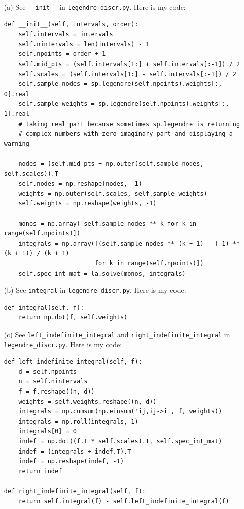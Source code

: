 \documentclass[10pt]{article}
\begin{document}
\begin{itemize}

\item[(a)] See \verb+__init__+ in \verb+legendre_discr.py+. Here is my code: \begin{lstlisting}
def __init__(self, intervals, order):
    self.intervals = intervals
    self.nintervals = len(intervals) - 1
    self.npoints = order + 1
    self.mid_pts = (self.intervals[1:] + self.intervals[:-1]) / 2
    self.scales = (self.intervals[1:] - self.intervals[:-1]) / 2
    self.sample_nodes = sp.legendre(self.npoints).weights[:, 0].real
    self.sample_weights = sp.legendre(self.npoints).weights[:, 1].real
    # taking real part because sometimes sp.legendre is returning
    # complex numbers with zero imaginary part and displaying a warning

    nodes = (self.mid_pts + np.outer(self.sample_nodes, self.scales)).T
    self.nodes = np.reshape(nodes, -1)
    weights = np.outer(self.scales, self.sample_weights)
    self.weights = np.reshape(weights, -1)

    monos = np.array([self.sample_nodes ** k for k in range(self.npoints)])
    integrals = np.array([(self.sample_nodes ** (k + 1) - (-1) ** (k + 1)) / (k + 1)
                         for k in range(self.npoints)])
    self.spec_int_mat = la.solve(monos, integrals)
\end{lstlisting}

\item[(b)] See \verb+integral+ in \verb+legendre_discr.py+. Here is my code: \begin{lstlisting}
def integral(self, f):
    return np.dot(f, self.weights)
\end{lstlisting}

\item[(c)] See \verb+left_indefinite_integral+ and \verb+right_indefinite_integral+ in \verb+legendre_discr.py+. Here is my code: \begin{lstlisting}
def left_indefinite_integral(self, f):
    d = self.npoints
    n = self.nintervals
    f = f.reshape((n, d))
    weights = self.weights.reshape((n, d))
    integrals = np.cumsum(np.einsum('ij,ij->i', f, weights))
    integrals = np.roll(integrals, 1)
    integrals[0] = 0
    indef = np.dot((f.T * self.scales).T, self.spec_int_mat)
    indef = (integrals + indef.T).T
    indef = np.reshape(indef, -1)
    return indef

def right_indefinite_integral(self, f):
    return self.integral(f) - self.left_indefinite_integral(f)
\end{lstlisting}


\end{itemize}
\end{document}
